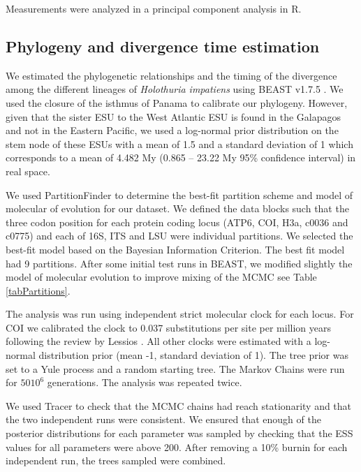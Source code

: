 \documentclass{article}
\begin{document}
Measurements were analyzed in a principal component analysis in R.

\subsection{Phylogeny and divergence time estimation}

We estimated the phylogenetic relationships and the timing of the divergence
among the different lineages of \textit{Holothuria impatiens} using BEAST v1.7.5
\cite{}. We used the closure of the isthmus of Panama to calibrate our
phylogeny. However, given that the sister ESU to the West Atlantic ESU is found
in the Galapagos and not in the Eastern Pacific, we used a log-normal prior
distribution on the stem node of these ESUs with a mean of 1.5 and a standard
deviation of 1 which corresponds to a mean of 4.482 My (0.865 -- 23.22 My 95\%
confidence interval) in real space.

We used PartitionFinder \cite{} to determine the best-fit partition scheme and
model of molecular of evolution for our dataset. We defined the data blocks such
that the three codon position for each protein coding locus (ATP6, COI, H3a,
c0036 and c0775) and each of 16S, ITS and LSU were individual partitions. We
selected the best-fit model based on the Bayesian Information Criterion. The
best fit model had 9 partitions. After some initial test runs in BEAST, we
modified slightly the model of molecular evolution to improve mixing of the MCMC
see Table \ref{tabPartitions}.

The analysis was run using independent strict molecular clock for each
locus. For COI we calibrated the clock to 0.037 substitutions per site per
million years following the review by Lessios \cite{Lessios2008}. All other
clocks were estimated with a log-normal distribution prior (mean -1, standard
deviation of 1). The tree prior was set to a Yule process and a random starting
tree. The Markov Chains were run for $50 10^6$ generations. The analysis was
repeated twice.

We used Tracer \cite{} to check that the MCMC chains had reach stationarity and
that the two independent runs were consistent. We ensured that enough of the posterior
distributions for each parameter was sampled by checking that the ESS values for
all parameters were above 200. After removing a 10\% burnin for each independent
run, the trees sampled were combined.
\end{document}
